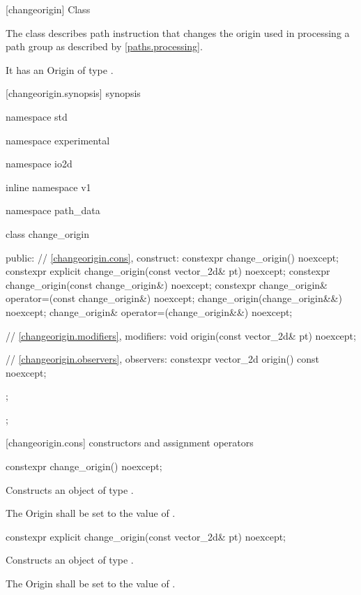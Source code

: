  [changeorigin] {Class }

\pnum
{}
The class  describes path instruction that changes the origin used in processing a path group as described by \ref{paths.processing}.

\pnum
It has an Origin of type .

 [changeorigin.synopsis] { synopsis}

\begin{codeblock}
namespace std { namespace experimental { namespace io2d { inline namespace v1 {
  namespace path_data {
    class change_origin {
    public:
      // \ref{changeorigin.cons}, construct:
      constexpr change_origin() noexcept;
      constexpr explicit change_origin(const vector_2d& pt) noexcept;
      constexpr change_origin(const change_origin&) noexcept;
      constexpr change_origin& operator=(const change_origin&) noexcept;
      change_origin(change_origin&&) noexcept;
      change_origin& operator=(change_origin&&) noexcept;

      // \ref{changeorigin.modifiers}, modifiers:
      void origin(const vector_2d& pt) noexcept;

      // \ref{changeorigin.observers}, observers:
      constexpr vector_2d origin() const noexcept;
    };
  };
} } } }
\end{codeblock}

 [changeorigin.cons] { constructors and assignment operators}

\begin{itemdecl}
constexpr change_origin() noexcept;
\end{itemdecl}
\begin{itemdescr}
\pnum
\effects
Constructs an object of type .

\pnum
The Origin shall be set to the value of .
\end{itemdescr}

\begin{itemdecl}
constexpr explicit change_origin(const vector_2d& pt) noexcept;
\end{itemdecl}
\begin{itemdescr}
\pnum
\effects
Constructs an object of type .

\pnum
The Origin shall be set to the value of .
\end{itemdescr}

